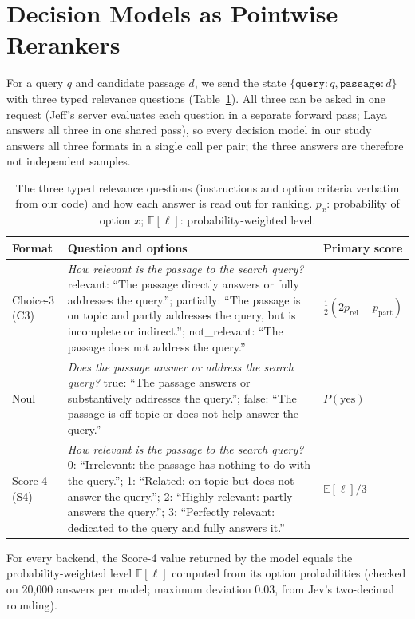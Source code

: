 \section{Decision Models as Pointwise Rerankers}

For a query $q$ and candidate passage $d$, we send the state $\{\texttt{query}: q, \texttt{passage}: d\}$ with three typed relevance questions (Table~\ref{tab:questions}).
All three can be asked in one request (Jeff\kern0pt's server evaluates each question in a separate forward pass; Laya answers all three in one shared pass), so every decision model in our study answers all three formats in a single call per pair; the three answers are therefore not independent samples.

\begin{table}[t]
\centering
\footnotesize
\setlength{\tabcolsep}{3pt}
\caption{The three typed relevance questions (instructions and option criteria verbatim from our code) and how each answer is read out for ranking. $p_x$: probability of option $x$; $\mathbb{E}[\ell]$: probability-weighted level.}
\label{tab:questions}
\begin{tabular}{p{1.5cm}p{8.7cm}p{2.2cm}}
\toprule
Format & Question and options & Primary score \\
\midrule
Choice-3 (C3) & \emph{How relevant is the passage to the search query?} relevant: ``The passage directly answers or fully addresses the query.''; partially: ``The passage is on topic and partly addresses the query, but is incomplete or indirect.''; not\_relevant: ``The passage does not address the query.'' & $\tfrac{1}{2}(2p_\text{rel}+p_\text{part})$ \\
\addlinespace[2pt]
Noul & \emph{Does the passage answer or address the search query?} true: ``The passage answers or substantively addresses the query.''; false: ``The passage is off topic or does not help answer the query.'' & $P(\text{yes})$ \\
\addlinespace[2pt]
Score-4 (S4) & \emph{How relevant is the passage to the search query?} 0: ``Irrelevant: the passage has nothing to do with the query.''; 1: ``Related: on topic but does not answer the query.''; 2: ``Highly relevant: partly answers the query.''; 3: ``Perfectly relevant: dedicated to the query and fully answers it.'' & $\mathbb{E}[\ell]/3$ \\
\bottomrule
\end{tabular}
\end{table}

For every backend, the Score-4 value returned by the model equals the probability-weighted level $\mathbb{E}[\ell]$ computed from its option probabilities (checked on 20{,}000 answers per model; maximum deviation 0.03, from Jev's two-decimal rounding).

